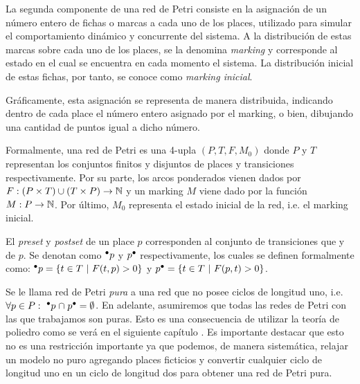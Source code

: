 La segunda componente de una red de Petri consiste en la asignación
de un número entero de fichas o marcas a cada uno de los places, 
utilizado para simular el comportamiento dinámico y concurrente del sistema.
A la distribución de estas marcas sobre cada uno de los places, se la denomina
\textit{marking} y corresponde al estado en el cual se encuentra en cada momento el sistema.
La distribución inicial de estas fichas, por tanto, se conoce como \textit{marking inicial}.

Gráficamente, esta asignación se representa de manera distribuida, indicando dentro 
de cada place el número entero asignado por el marking, o bien, dibujando una 
cantidad de puntos igual a dicho número.

Formalmente, una red de Petri es una 4-upla $(P,T,F,M_0)$ donde $P$ y $T$\footnotemark[1]
representan los conjuntos finitos y disjuntos de places y transiciones respectivamente.
Por su parte, los arcos ponderados vienen dados por \mbox{$F:(P \times T) \cup (T \times P)  \to \mathbb{N}$}
y un marking $M$ viene dado por la función \mbox{$M:P \to \mathbb{N}$}.
Por último, $M_0$ representa el estado inicial de la red, i.e. el marking inicial.


El \textit{preset} y \textit{postset} de un place $p$ corresponden al conjunto 
de transiciones que  y  de $p$. Se denotan como $\mbox{$^\bullet p$}$ y $\mbox{$p^\bullet$}$
respectivamente, los cuales se definen formalmente como: $\mbox{$^\bullet p$} =  \{t \in T ~|~ F(t,p) > 0 \}$
y $\mbox{$p^\bullet$} = \{t \in T ~|~ F(p,t) > 0 \}$.

Se le llama red de Petri \emph{pura} a una red que no posee ciclos de longitud uno, i.e.
$\forall p \in P:~ {\mbox{$^\bullet p$}} \mathrel{\cap} {\mbox{$p^\bullet$}} = \emptyset$.
En adelante, asumiremos que todas las redes de Petri con las que trabajamos son puras.
Esto es una consecuencia de utilizar la teoría de poliedro como se verá en el siguiente capítulo
.
Es importante destacar que esto no es una 
restricción importante ya que podemos, de manera sistemática, relajar un modelo no puro agregando
places ficticios y convertir cualquier ciclo de longitud uno en un ciclo de longitud dos para
obtener una red de Petri pura.

